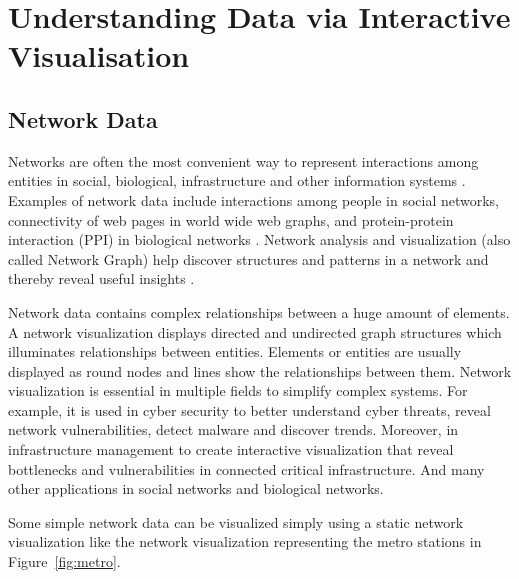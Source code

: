 \section{Understanding Data via Interactive Visualisation}
\subsection{Network Data}


Networks are often the most convenient way to represent interactions among entities in social, biological, infrastructure and other information systems \cite{becker1995visualizing, herman2000graph}. Examples of network data include interactions among people in social networks, connectivity of web pages in world wide web graphs, and protein-protein interaction (PPI) in biological networks \cite{leskovec2014snap, arifuzzaman2017scalable}. Network analysis and visualization (also called Network Graph) help discover structures and patterns in a network and thereby reveal useful insights \cite{herman2000graph, arifuzzaman2015space, arifuzzaman2012patric, arifuzzaman2017scalable, arifuzzaman2015fast}.


Network data contains complex relationships between a huge amount of elements. A network visualization displays directed and undirected graph structures which illuminates relationships between entities. Elements or entities are usually displayed as round nodes and lines show the relationships between them. Network visualization is essential in multiple fields to simplify complex systems. For example, it is used in cyber security to better understand cyber threats, reveal network vulnerabilities, detect malware and discover trends. Moreover, in infrastructure management to create interactive visualization that reveal bottlenecks and vulnerabilities in connected critical infrastructure. And many other applications in social networks and biological networks. 


Some simple network data can be visualized simply using a static network visualization like the network visualization representing the metro stations in Figure~\ref{fig:metro}.


